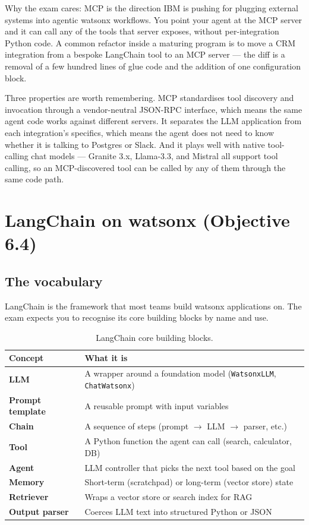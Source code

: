 Why the exam cares: MCP is the direction IBM is pushing for plugging external systems into agentic watsonx workflows. You point your agent at the MCP server and it can call any of the tools that server exposes, without per-integration Python code. A common refactor inside a maturing program is to move a CRM integration from a bespoke LangChain tool to an MCP server --- the diff is a removal of a few hundred lines of glue code and the addition of one configuration block.

Three properties are worth remembering. MCP standardises tool discovery and invocation through a vendor-neutral JSON-RPC interface, which means the same agent code works against different servers. It separates the LLM application from each integration's specifics, which means the agent does not need to know whether it is talking to Postgres or Slack. And it plays well with native tool-calling chat models --- Granite 3.x, Llama-3.3, and Mistral all support tool calling, so an MCP-discovered tool can be called by any of them through the same code path.

\section{LangChain on watsonx (Objective 6.4)}

\subsection{The vocabulary}

LangChain is the framework that most teams build watsonx applications on. The exam expects you to recognise its core building blocks by name and use.

\begin{table}[h]
\centering
\small
\begin{tabularx}{\textwidth}{l X}
\toprule
\textbf{Concept}        & \textbf{What it is} \\
\midrule
\textbf{LLM}            & A wrapper around a foundation model (\texttt{WatsonxLLM}, \texttt{ChatWatsonx}) \\
\textbf{Prompt template}& A reusable prompt with input variables \\
\textbf{Chain}          & A sequence of steps (prompt $\to$ LLM $\to$ parser, etc.) \\
\textbf{Tool}           & A Python function the agent can call (search, calculator, DB) \\
\textbf{Agent}          & LLM controller that picks the next tool based on the goal \\
\textbf{Memory}         & Short-term (scratchpad) or long-term (vector store) state \\
\textbf{Retriever}      & Wraps a vector store or search index for RAG \\
\textbf{Output parser}  & Coerces LLM text into structured Python or JSON \\
\bottomrule
\end{tabularx}
\caption{LangChain core building blocks.}
\label{tab:langchain-blocks}
\end{table}

